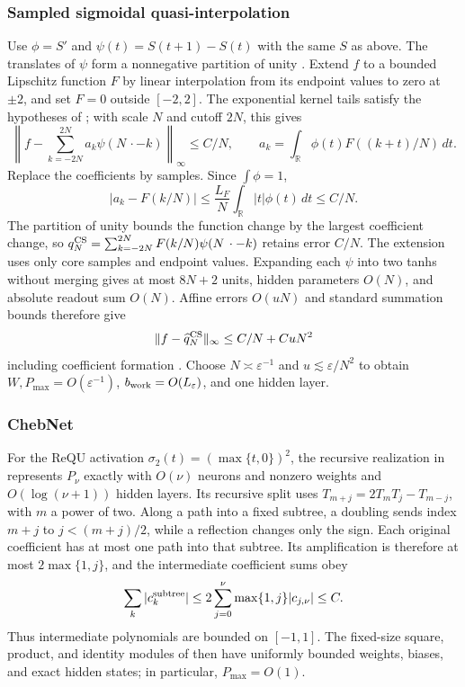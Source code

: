 \subsubsection{Sampled sigmoidal quasi-interpolation}
Use $\phi=S'$ and $\psi(t)=S(t+1)-S(t)$ with the same $S$ as above.
The translates of $\psi$ form a nonnegative partition of unity
\cite[Lemma~5.1]{Costarelli2015Approximation}. Extend $f$ to a bounded
Lipschitz function $F$ by linear interpolation from its endpoint values to
zero at $\pm2$, and set $F=0$ outside $[-2,2]$. The exponential kernel
tails satisfy the hypotheses of \cite[Theorem~5.4(ii)]{Costarelli2015Approximation}; with scale
$N$ and cutoff $2N$, this gives
\begin{equation}
 \left\|f-\sum_{k=-2N}^{2N}a_k\psi(N\,\cdot-k)\right\|_\infty\le C/N,
 \qquad a_k=\int_{\mathbb R}\phi(t)F((k+t)/N)\,dt.
 \label{eq:cmp-cs-integral}
\end{equation}
Replace the coefficients by samples. Since $\int\phi=1$,
\[
 |a_k-F(k/N)|\le\frac{L_F}{N}\int_{\mathbb R}|t|\phi(t)\,dt\le C/N.
\]
The partition of unity bounds the function change by the largest coefficient
change, so $q_N^{\rm CS}=\sum_{k=-2N}^{2N}F(k/N)\psi(N\,\cdot-k)$ retains
error $C/N$. The extension uses only core samples and endpoint values.
Expanding each $\psi$ into two tanhs without merging gives at most $8N+2$
units, hidden parameters $O(N)$, and absolute readout sum $O(N)$.
Affine errors $O(uN)$ and standard summation bounds therefore give
\begin{equation}
 \|f-\widehat q_N^{\rm CS}\|_\infty\le C/N+CuN^2
 \label{eq:cmp-cs-error}
\end{equation}
including coefficient formation \cite[Chs.~3--4]{Higham2002}. Choose
$N\asymp\varepsilon^{-1}$ and $u\lesssim\varepsilon/N^2$ to obtain
$W,P_{\max}=O(\varepsilon^{-1})$, $b_{\rm work}=O(L_\varepsilon)$,
and one hidden layer.

\subsubsection{ChebNet}
For the ReQU activation $\sigma_2(t)=(\max\{t,0\})^2$, the recursive
realization in \cite[Sec.~2.1, Theorem~1, 2019 version]{tang2019chebnet}
represents $P_\nu$ exactly with $O(\nu)$ neurons
and nonzero weights and $O(\log(\nu+1))$ hidden layers. Its recursive split
uses $T_{m+j}=2T_mT_j-T_{m-j}$, with $m$ a power of two. Along a path into
a fixed subtree, a doubling sends index $m+j$ to $j<(m+j)/2$, while a
reflection changes only the sign. Each original coefficient has at most one
path into that subtree. Its amplification is therefore at most
$2\max\{1,j\}$, and the intermediate coefficient sums obey
\begin{equation}
 \sum_k|c_k^{\rm subtree}|
 \le2\sum_{j=0}^{\nu}\max\{1,j\}|c_{j,\nu}|\le C.
 \label{eq:cmp-chebnet-subtree}
\end{equation}
Thus intermediate polynomials are bounded on $[-1,1]$. The fixed-size square,
product, and identity modules of \cite[Lemma~2]{tang2019chebnet} then have
uniformly bounded weights, biases, and exact hidden states; in particular,
$P_{\max}=O(1)$.

